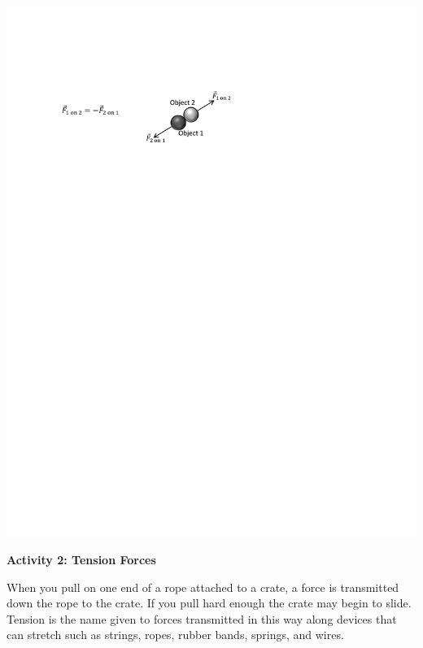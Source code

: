 \vspace{0.3cm}
{\par\centering \includegraphics{newton/newton_fig2_new.pdf} \par}
\vspace{0.3cm}


\pagebreak
\textbf{Activity 2: Tension Forces}

When you pull on one end of a rope attached to a crate, a force is transmitted
down the rope to the crate. If you pull hard enough the crate may begin to slide.
Tension is the name given to forces transmitted in this way along devices that
can stretch such as strings, ropes, rubber bands, springs, and wires.

